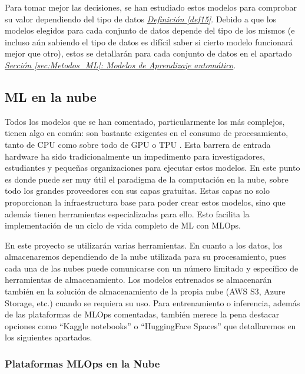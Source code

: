 Para tomar mejor las decisiones, se han estudiado estos modelos para comprobar su valor dependiendo del tipo de datos \hyperref[def15]{\textit{Definición \ref*{def15}}}. Debido a que los modelos elegidos para cada conjunto de datos depende del tipo de los mismos (e incluso aún sabiendo el tipo de datos es difícil saber si cierto modelo funcionará mejor que otro), estos se detallarán para cada conjunto de datos en el apartado \hyperref[sec:Materiales_datos]{\textit{Sección \ref*{sec:Metodos_ML}: Modelos de Aprendizaje automático}}.

\subsection{ML en la nube}

Todos los modelos que se han comentado, particularmente los más complejos, tienen algo en común: son bastante exigentes en el consumo de procesamiento, tanto de CPU como sobre todo de GPU o TPU \citep{Sze_2017}. Esta barrera de entrada hardware ha sido tradicionalmente un impedimento para investigadores, estudiantes y pequeñas organizaciones para ejecutar estos modelos. En este punto es donde puede ser muy útil el paradigma de la computación en la nube, sobre todo los grandes proveedores con sus capas gratuitas. Estas capas no solo proporcionan la infraestructura base para poder crear estos modelos, sino que además tienen herramientas especializadas para ello. Esto facilita la implementación de un ciclo de vida completo de ML con MLOps.

En este proyecto se utilizarán varias herramientas. En cuanto a los datos, los almacenaremos dependiendo de la nube utilizada para su procesamiento, pues cada una de las nubes puede comunicarse con un número limitado y específico de herramientas de almacenamiento. Los modelos entrenados se almacenarán también en la solución de almacenamiento de la propia nube (AWS S3, Azure Storage, etc.) cuando se requiera su uso. Para entrenamiento o inferencia, además de las plataformas de MLOps comentadas, también merece la pena destacar opciones como ``Kaggle notebooks'' o ``HuggingFace Spaces'' que detallaremos en los siguientes apartados.


\subsubsection{Plataformas MLOps en la Nube}

